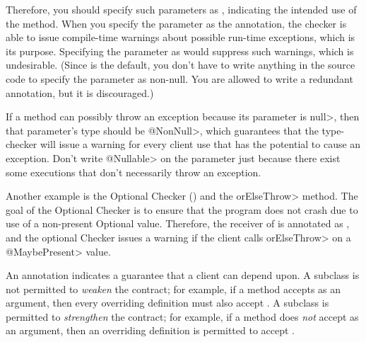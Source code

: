 Therefore, you should specify such parameters as
, indicating
the intended use of the method.  When you specify the parameter as the 
annotation, the checker is able to issue compile-time warnings about
possible run-time exceptions, which is its purpose.  Specifying the parameter
as  would suppress such warnings, which is undesirable.
(Since  is the default, you don't have to write anything in
the source code to specify the parameter as non-null.  You are allowed to
write a redundant  annotation, but it is discouraged.)

If a method can possibly throw an exception because its parameter
is \<null>, then that parameter's type should be \<@NonNull>, which
guarantees that the type-checker will issue a warning for every client
use that has the potential to cause an exception.  Don't write
\<@Nullable> on the parameter just because there exist some executions that
don't necessarily throw an exception.


Another example is the Optional Checker ()
and the \<orElseThrow> method.
The goal of the Optional Checker is to ensure that the program does not
crash due to use of a non-present Optional value.  Therefore, the receiver
of  is annotated as
,
and the optional Checker issues a warning if the client calls
\<orElseThrow> on a \<@MaybePresent> value.



An annotation indicates a guarantee that a client can depend upon.  A subclass
is not permitted to \emph{weaken} the contract; for example,
if a method accepts  as an argument, then every overriding
definition must also accept .
A subclass is permitted to \emph{strengthen} the contract; for example,
if a method does \emph{not} accept  as an argument, then an
overriding definition is permitted to accept .

